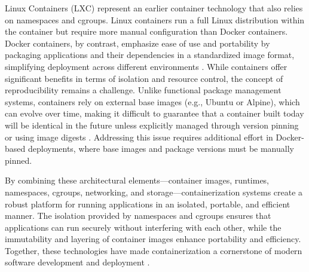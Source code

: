 Linux Containers (LXC) represent an earlier container technology that also
relies on namespaces and cgroups. Linux containers run a full Linux
distribution within the container but require more manual configuration than
Docker containers. Docker containers, by contrast, emphasize ease of use and
portability by packaging applications and their dependencies in a
standardized image format, simplifying deployment across different
environments \cite{LinuxContainers}. While containers offer significant
benefits in terms of isolation and resource control, the concept of
reproducibility remains a challenge. Unlike functional package management
systems, containers rely on external base images (e.g., Ubuntu or Alpine),
which can evolve over time, making it difficult to guarantee that a container
built today will be identical in the future unless explicitly managed through
version pinning or using image digests \cite{InotifySharedDrives}. Addressing
this issue requires additional effort in Docker-based deployments, where base
images and package versions must be manually pinned.

By combining these architectural elements—container images, runtimes,
namespaces, cgroups, networking, and storage—containerization systems create
a robust platform for running applications in an isolated, portable, and
efficient manner. The isolation provided by namespaces and cgroups ensures
that applications can run securely without interfering with each other, while
the immutability and layering of container images enhance portability and
efficiency. Together, these technologies have made containerization a
cornerstone of modern software development and deployment
\cite{Cgroups2024}.
